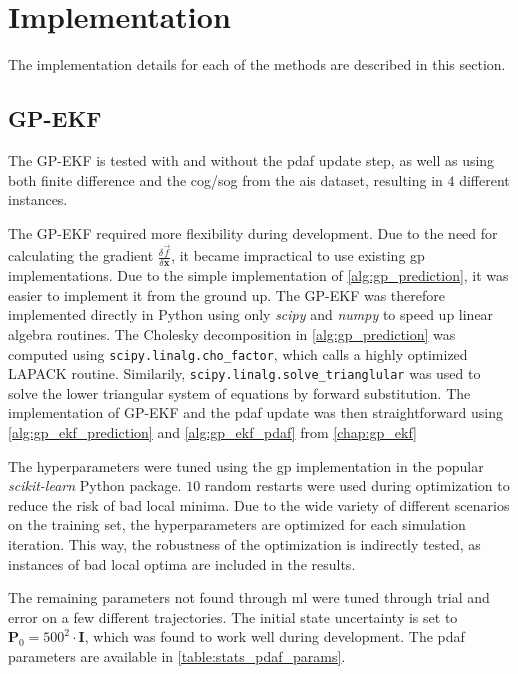 \section{Implementation}
The implementation details for each of the methods are described in this section.

\subsection{GP-EKF}
The GP-EKF is tested with and without the \acrshort{pdaf} update step, as well as using both finite difference and the \acrshort{cog}/\acrshort{sog} from the \acrshort{ais} dataset, resulting in $4$ different instances.

The GP-EKF required more flexibility during development. Due to the need for calculating the gradient $\frac{\delta \vec{f}}{\delta \boldsymbol{x}}$, it became impractical to use existing \acrshort{gp} implementations. Due to the simple implementation of \cref{alg:gp_prediction}, it was easier to implement it from the ground up.
The GP-EKF was therefore implemented directly in Python using only \textit{scipy}\cite{scipy} and \textit{numpy}\cite{numpy} to speed up linear algebra routines. The Cholesky decomposition in \cref{alg:gp_prediction} was computed using \texttt{scipy.linalg.cho\_factor}, which calls a highly optimized LAPACK routine. Similarily, \texttt{scipy.linalg.solve\_\-trianglular} was used to solve the lower triangular system of equations by forward substitution. The implementation of GP-EKF and the \acrshort{pdaf} update was then straightforward using \cref{alg:gp_ekf_prediction} and \cref{alg:gp_ekf_pdaf} from \cref{chap:gp_ekf}

The hyperparameters were tuned using the \acrshort{gp} implementation in the popular \textit{scikit-learn} \cite{scikit-learn} Python package. $10$ random restarts were used during optimization to reduce the risk of bad local minima. Due to the wide variety of different scenarios on the training set, the hyperparameters are optimized for each simulation iteration. This way, the robustness of the optimization is indirectly tested, as instances of bad local optima are included in the results.


The remaining parameters not found through \acrshort{ml} were tuned through trial and error on a few different trajectories.
The initial state uncertainty is set to $\boldsymbol{P}_0 = 500^2 \cdot \boldsymbol{I}$, which was found to work well during development. The \acrshort{pdaf} parameters are available in \cref{table:stats_pdaf_params}.


